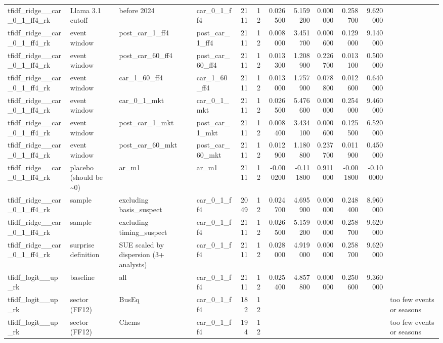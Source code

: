 \begin{table}
\begin{tabular}{llllrrrrrrrl}
tfidf\_ridge\_\_car\_0\_1\_ff4\_rk & Llama 3.1 cutoff & before 2024 & car\_0\_1\_ff4 & 2111 & 12 & 0.026500 & 5.159200 & 0.000000 & 0.258700 & 9.620000 &  \\
tfidf\_ridge\_\_car\_0\_1\_ff4\_rk & event window & post\_car\_1\_ff4 & post\_car\_1\_ff4 & 2111 & 12 & 0.008000 & 3.451700 & 0.000600 & 0.129000 & 9.140000 &  \\
tfidf\_ridge\_\_car\_0\_1\_ff4\_rk & event window & post\_car\_60\_ff4 & post\_car\_60\_ff4 & 2111 & 12 & 0.013300 & 1.208900 & 0.226700 & 0.013100 & 0.500000 &  \\
tfidf\_ridge\_\_car\_0\_1\_ff4\_rk & event window & car\_1\_60\_ff4 & car\_1\_60\_ff4 & 2111 & 12 & 0.013000 & 1.757900 & 0.078800 & 0.012600 & 0.640000 &  \\
tfidf\_ridge\_\_car\_0\_1\_ff4\_rk & event window & car\_0\_1\_mkt & car\_0\_1\_mkt & 2111 & 12 & 0.026500 & 5.476600 & 0.000000 & 0.254000 & 9.460000 &  \\
tfidf\_ridge\_\_car\_0\_1\_ff4\_rk & event window & post\_car\_1\_mkt & post\_car\_1\_mkt & 2111 & 12 & 0.008400 & 3.434100 & 0.000600 & 0.125500 & 6.520000 &  \\
tfidf\_ridge\_\_car\_0\_1\_ff4\_rk & event window & post\_car\_60\_mkt & post\_car\_60\_mkt & 2111 & 12 & 0.012900 & 1.180800 & 0.237700 & 0.011900 & 0.450000 &  \\
tfidf\_ridge\_\_car\_0\_1\_ff4\_rk & placebo (should be \textasciitilde 0) & ar\_m1 & ar\_m1 & 2111 & 12 & -0.000200 & -0.111800 & 0.911000 & -0.001800 & -0.100000 &  \\
tfidf\_ridge\_\_car\_0\_1\_ff4\_rk & sample & excluding basis\_suspect & car\_0\_1\_ff4 & 2049 & 12 & 0.024700 & 4.695900 & 0.000000 & 0.248400 & 8.960000 &  \\
tfidf\_ridge\_\_car\_0\_1\_ff4\_rk & sample & excluding timing\_suspect & car\_0\_1\_ff4 & 2111 & 12 & 0.026500 & 5.159200 & 0.000000 & 0.258700 & 9.620000 &  \\
tfidf\_ridge\_\_car\_0\_1\_ff4\_rk & surprise definition & SUE scaled by dispersion (3+ analysts) & car\_0\_1\_ff4 & 2111 & 12 & 0.028000 & 4.919000 & 0.000000 & 0.258700 & 9.620000 &  \\
tfidf\_logit\_\_up\_rk & baseline & all & car\_0\_1\_ff4 & 2111 & 12 & 0.025400 & 4.857800 & 0.000000 & 0.250600 & 9.360000 &  \\
tfidf\_logit\_\_up\_rk & sector (FF12) & BusEq & car\_0\_1\_ff4 & 182 & 12 &  &  &  &  &  & too few events or seasons \\
tfidf\_logit\_\_up\_rk & sector (FF12) & Chems & car\_0\_1\_ff4 & 194 & 12 &  &  &  &  &  & too few events or seasons \\

\end{tabular}
\end{table}
